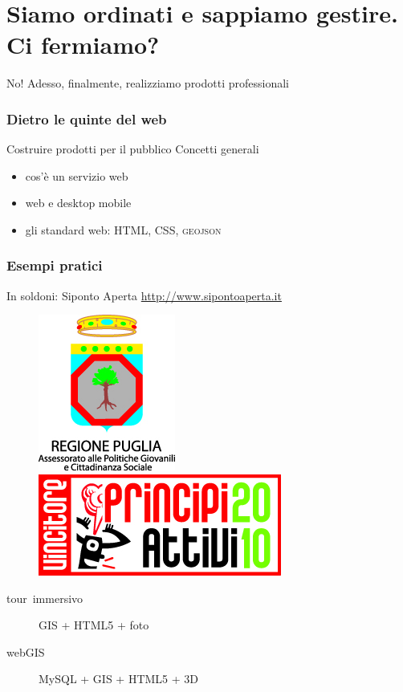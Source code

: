 \documentclass{beamer}
\begin{document}
\part{Siamo ordinati e sappiamo gestire. Ci fermiamo?}
	\frame{\partpage}

    \begin{frame}{No!}
        \centering
        \Huge
        Adesso, finalmente, realizziamo prodotti professionali
    \end{frame}

    \section{Dietro le quinte del web}

        \begin{frame}{Costruire prodotti per il pubblico}
            Concetti generali
            \begin{itemize}
                \item cos'è un servizio web
                \item web e desktop mobile
                \item gli standard web: \textsc{HTML}, \textsc{CSS}, \textsc{geojson}
            \end{itemize}
        \end{frame}

    \section{Esempi pratici}

        \begin{frame}{In soldoni: Siponto Aperta}
            \centering
            \url{http://www.sipontoaperta.it}
            \vfill
			\begin{figure}[]
				\begin{center}
					\includegraphics[width=0.2\linewidth]{regione}\hfill
					\includegraphics[width=0.3\linewidth]{pa}
				\end{center}
				\label{fig:regione}
			\end{figure}
            \vfill
            \begin{description}
                \item[tour~immersivo] GIS + HTML5 + foto
                \item[webGIS] MySQL + GIS + HTML5 + 3D
            \end{description}
        \end{frame}
\end{document}
